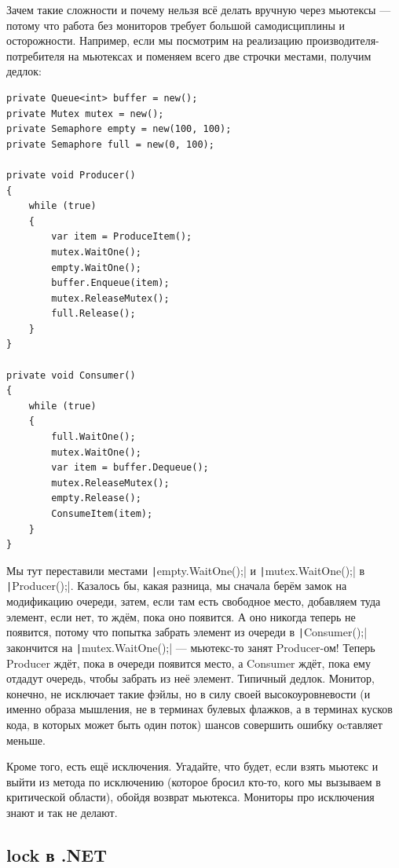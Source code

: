 \documentclass[a5paper]{article}
\begin{document}
Зачем такие сложности и почему нельзя всё делать вручную через мьютексы --- потому что работа без мониторов требует большой самодисциплины и осторожности. Например, если мы посмотрим на реализацию производителя-потребителя на мьютексах и поменяем всего две строчки местами, получим дедлок:

\begin{verbatim}
private Queue<int> buffer = new();
private Mutex mutex = new();
private Semaphore empty = new(100, 100);
private Semaphore full = new(0, 100);

private void Producer()
{
    while (true)
    {
        var item = ProduceItem();
        mutex.WaitOne();
        empty.WaitOne();
        buffer.Enqueue(item);
        mutex.ReleaseMutex();
        full.Release();
    }
}

private void Consumer()
{
    while (true)
    {
        full.WaitOne();
        mutex.WaitOne();
        var item = buffer.Dequeue();
        mutex.ReleaseMutex();
        empty.Release();
        ConsumeItem(item);
    }
}
\end{verbatim}

Мы тут переставили местами \texttt|empty.WaitOne();| и \texttt|mutex.WaitOne();| в \texttt|Producer();|. Казалось бы, какая разница, мы сначала берём замок на модификацию очереди, затем, если там есть свободное место, добавляем туда элемент, если нет, то ждём, пока оно появится. А оно никогда теперь не появится, потому что попытка забрать элемент из очереди в \texttt|Consumer();| закончится на \texttt|mutex.WaitOne();| --- мьютекс-то занят Producer-ом! Теперь Producer ждёт, пока в очереди появится место, а Consumer ждёт, пока ему отдадут очередь, чтобы забрать из неё элемент. Типичный дедлок. Монитор, конечно, не исключает такие фэйлы, но в силу своей высокоуровневости (и именно образа мышления, не в терминах булевых флажков, а в терминах кусков кода, в которых может быть один поток) шансов совершить ошибку оcтавляет меньше. 

Кроме того, есть ещё исключения. Угадайте, что будет, если взять мьютекс и выйти из метода по исключению (которое бросил кто-то, кого мы вызываем в критической области), обойдя возврат мьютекса. Мониторы про исключения знают и так не делают.

\subsection{lock в .NET}
\end{document}

